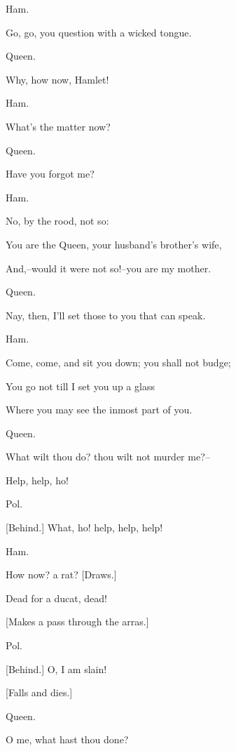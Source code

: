 \documentclass[12pt]{book}
\begin{document}
Ham.

Go, go, you question with a wicked tongue.



Queen.

Why, how now, Hamlet!



Ham.

What's the matter now?



Queen.

Have you forgot me?



Ham.

No, by the rood, not so:

You are the Queen, your husband's brother's wife,

And,--would it were not so!--you are my mother.



Queen.

Nay, then, I'll set those to you that can speak.



Ham.

Come, come, and sit you down; you shall not budge;

You go not till I set you up a glass

Where you may see the inmost part of you.



Queen.

What wilt thou do? thou wilt not murder me?--

Help, help, ho!



Pol.

[Behind.] What, ho! help, help, help!



Ham.

How now? a rat? [Draws.]

Dead for a ducat, dead!



[Makes a pass through the arras.]



Pol.

[Behind.] O, I am slain!



[Falls and dies.]



Queen.

O me, what hast thou done?
\end{document}

